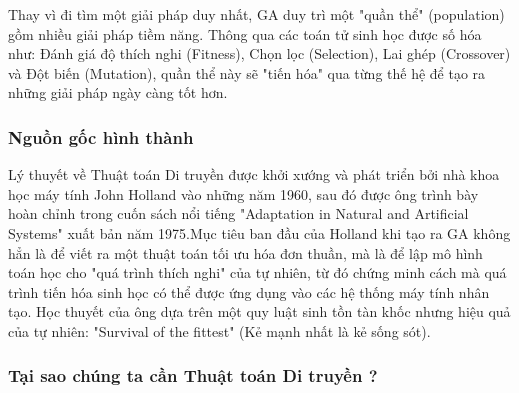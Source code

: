 \documentclass[12pt,a4paper]{article}
\numberwithin{figure}{subsection}
\begin{document}
Thay vì đi tìm một giải pháp duy nhất, GA duy trì một "quần thể" (population) gồm nhiều giải pháp tiềm năng. Thông qua các toán tử sinh học được số hóa như: Đánh giá độ thích nghi (Fitness), Chọn lọc (Selection), Lai ghép (Crossover) và Đột biến (Mutation), quần thể này sẽ "tiến hóa" qua từng thế hệ để tạo ra những giải pháp ngày càng tốt hơn.

\subsubsection{Nguồn gốc hình thành}

Lý thuyết về Thuật toán Di truyền được khởi xướng và phát triển bởi nhà khoa học máy tính John Holland vào những năm 1960, sau đó được ông trình bày hoàn chỉnh trong cuốn sách nổi tiếng "Adaptation in Natural and Artificial Systems" xuất bản năm 1975.Mục tiêu ban đầu của Holland khi tạo ra GA không hẳn là để viết ra một thuật toán tối ưu hóa đơn thuần, mà là để lập mô hình toán học cho "quá trình thích nghi" của tự nhiên, từ đó chứng minh cách mà quá trình tiến hóa sinh học có thể được ứng dụng vào các hệ thống máy tính nhân tạo. Học thuyết của ông dựa trên một quy luật sinh tồn tàn khốc nhưng hiệu quả của tự nhiên: "Survival of the fittest" (Kẻ mạnh nhất là kẻ sống sót).

\subsubsection{Tại sao chúng ta cần Thuật toán Di truyền ?}
\end{document}
